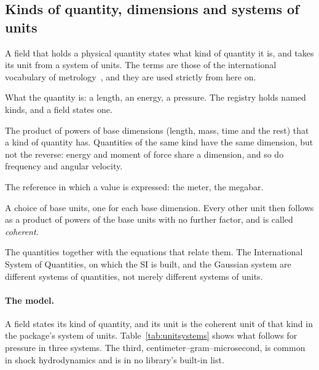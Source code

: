 \documentclass[11pt,a4paper]{article}
\begin{document}
\subsection{Kinds of quantity, dimensions and systems of units}
\label{sec:units}

A field that holds a physical quantity states what kind of quantity it is,
and takes its unit from a system of units.  The terms are those of the
international vocabulary of metrology~\cite{vim}, and they are used strictly
from here on.

\begin{description}[style=nextline,leftmargin=2em]
  \item[Kind of quantity.]
        What the quantity is: a length, an energy, a pressure.  The registry
        holds named kinds, and a field states one.
  \item[Dimension.]
        The product of powers of base dimensions (length, mass, time and the
        rest) that a kind of quantity has.  Quantities of the same kind have
        the same dimension, but not the reverse: energy and moment of force
        share a dimension, and so do frequency and angular velocity.
  \item[Unit.]
        The reference in which a value is expressed: the meter, the
        megabar.
  \item[System of units.]
        A choice of base units, one for each base dimension.  Every other
        unit then follows as a product of powers of the base units with no
        further factor, and is called \emph{coherent}.
  \item[System of quantities.]
        The quantities together with the equations that relate them.  The
        International System of Quantities, on which the SI is built, and
        the Gaussian system are different systems of quantities, not merely
        different systems of units.
\end{description}

\paragraph{The model.}  A field states its kind of quantity, and its unit is
the coherent unit of that kind in the package's system of units.
Table~\ref{tab:unitsystems} shows what follows for pressure in three systems.
The third, centimeter--gram--microsecond, is common in shock hydrodynamics
and is in no library's built-in list.
\end{document}
